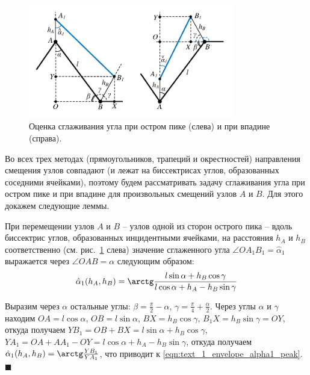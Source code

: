 \documentclass[
11pt,%
tightenlines,%
twoside,%
onecolumn,%
nofloats,%
nobibnotes,%
nofootinbib,%
superscriptaddress,%
noshowpacs,%
centertags]%
{revtex4}
\begin{document}
\begin{figure}[ht]
\setcaptionmargin{5mm}
\onelinecaptionstrue  %
\includegraphics[width=0.8\textwidth]{./pics/peak-cavern-general.pdf}
\caption{Оценка сглаживания угла при остром пике (слева) и при впадине (справа).}
\label{fig:text_1_remesh_2d_peak_cavern_general}
\end{figure}

Во всех трех методах (прямоугольников, трапеций и окрестностей) направления смещения узлов совпадают (и лежат на биссектрисах углов, образованных соседними ячейками), поэтому будем рассматривать задачу сглаживания угла при остром пике и при впадине для произвольных смещений узлов $A$ и $B$.
Для этого докажем следующие леммы.

\begin{lemma}\label{lem:text_1_peak_smooth}
При перемещении узлов $A$ и $B$ -- узлов одной из сторон острого пика -- вдоль биссектрис углов, образованных инцидентными ячейками, на расстояния $h_A$ и $h_B$ соответственно (см. рис.~\ref{fig:text_1_remesh_2d_peak_cavern_general} слева) значение сглаженного угла $\angle OA_1B_1 = \hat{\alpha}_1$ выражается через $\angle OAB = \alpha$ следующим образом:
\begin{equation}\label{eqn:text_1_envelope_alpha1_peak}
\hat{\alpha}_1(h_A, h_B) = \arctg \frac{l \sin \alpha + h_B \cos \gamma}{l \cos \alpha + h_A - h_B \sin \gamma}	
\end{equation}
\end{lemma}

Выразим через $\alpha$ остальные углы: $\beta = \frac{\pi}{2} - \alpha$, $\gamma = \frac{\pi}{4} + \frac{\alpha}{2}$.
Через углы $\alpha$ и $\gamma$ находим $OA = l \cos \alpha$, $OB = l \sin \alpha$, $BX = h_B \cos \gamma$, $B_1X = h_B \sin \gamma = OY$, откуда получаем $YB_1 = OB + BX = l \sin \alpha + h_B \cos \gamma$, $YA_1 = OA + AA_1 - OY = l \cos \alpha + h_A - h_B \sin \gamma$, откуда получаем $\hat{\alpha}_1(h_A, h_B) = \arctg \frac{YB_1}{YA_1}$, что приводит к \eqref{eqn:text_1_envelope_alpha1_peak}.
$\blacksquare$\\
\end{document}
